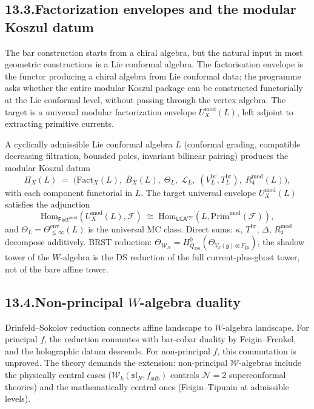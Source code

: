 \documentclass[11pt,reqno]{amsart}
\theoremstyle{definition}
\theoremstyle{remark}
\providecommand{\cF}{\mathcal{F}}
\providecommand{\cL}{\mathcal{L}}
\providecommand{\cN}{\mathcal{N}}
\providecommand{\cW}{\mathcal{W}}
\providecommand{\Hom}{\mathrm{Hom}}
\providecommand{\fg}{\mathfrak{g}}
\providecommand{\DS}{\mathrm{DS}}
\providecommand{\cyc}{\mathrm{cyc}}
\providecommand{\mod}{\mathrm{mod}}
\providecommand{\gh}{\mathrm{gh}}
\numberwithin{equation}{section}
\begin{document}
\subsection*{13.3.\enspace Factorization envelopes and the modular Koszul datum}

The bar construction starts from a chiral algebra, but the
natural input in most geometric constructions is a Lie conformal
algebra. The factorisation envelope is the functor producing a
chiral algebra from Lie conformal data; the programme asks
whether the entire modular Koszul package can be constructed
functorially at the Lie conformal level, without passing
through the vertex algebra. The target is a universal modular
factorization envelope $U^{\mod}_X(L)$, left adjoint to
extracting primitive currents.

A cyclically admissible Lie conformal algebra $L$ (conformal
grading, compatible decreasing filtration, bounded poles,
invariant bilinear pairing) produces the modular Koszul datum
\[
\Pi_X(L)
\;=\;
\bigl(
\mathrm{Fact}_X(L),\;
\bar B_X(L),\;
\Theta_L,\;
\cL_L,\;
(V^{\mathrm{br}}_L, T^{\mathrm{br}}_L),\;
R_4^{\mod}(L)
\bigr),
\]
with each component functorial in $L$. The target universal
envelope $U^{\mod}_X(L)$ satisfies the adjunction
\[
\Hom_{\mathsf{Fact}^{\mod}}(U^{\mod}_X(L), \cF)
\;\cong\;
\Hom_{\mathsf{LCA}^{\cyc}}(L, \mathrm{Prim}^{\mod}(\cF)),
\]
and $\Theta_L = \Theta^{\mathrm{env}}_{\le\infty}(L)$ is the
universal MC class. Direct sums: $\kappa$, $T^{\mathrm{br}}$,
$\Delta$, $R_4^{\mod}$ decompose additively. BRST reduction:
$\Theta_{\cW_N} = H^0_{Q_{\DS}}(\Theta_{V_k(\fg)\otimes F_{\gh}})$,
the shadow tower of the $W$-algebra is the DS reduction of
the full current-plus-ghost tower, not of the bare affine tower.

\subsection*{13.4.\enspace Non-principal $W$-algebra duality}

Drinfeld--Sokolov reduction connects affine landscape to
$W$-algebra landscape. For principal $f$, the reduction commutes
with bar-cobar duality by Feigin--Frenkel, and the holographic
datum descends. For non-principal $f$, this commutation is
unproved. The theory demands the extension: non-principal
$\cW$-algebras include the physically central cases
($\cW_k(\mathfrak{sl}_N, f_{\mathrm{sub}})$ controls $\cN = 2$
superconformal theories) and the mathematically central ones
(Feigin--Tipunin at admissible levels).
\end{document}
